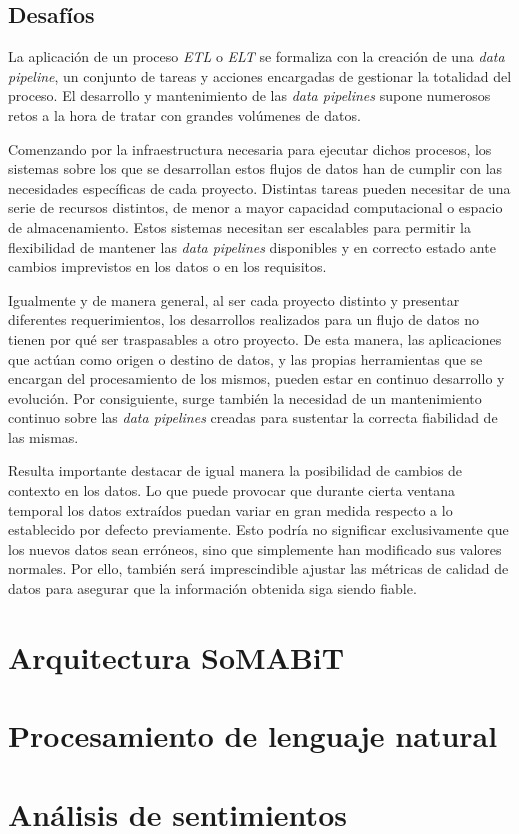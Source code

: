 \subsection{Desafíos}

La aplicación de un proceso \textit{ETL} o \textit{ELT} se formaliza con la creación de una \textit{data pipeline}, un conjunto de tareas y acciones encargadas de gestionar la totalidad del proceso. El desarrollo y mantenimiento de las \textit{data pipelines} supone numerosos retos a la hora de tratar con grandes volúmenes de datos.

Comenzando por la infraestructura necesaria para ejecutar dichos procesos, los sistemas sobre los que se desarrollan estos flujos de datos han de cumplir con las necesidades específicas de cada proyecto. Distintas tareas pueden necesitar de una serie de recursos distintos, de menor a mayor capacidad computacional o espacio de almacenamiento. Estos sistemas necesitan ser escalables para permitir la flexibilidad de mantener las \textit{data pipelines} disponibles y en correcto estado ante cambios imprevistos en los datos o en los requisitos.

Igualmente y de manera general, al ser cada proyecto distinto y presentar diferentes requerimientos, los desarrollos realizados para un flujo de datos no tienen por qué ser traspasables a otro proyecto. De esta manera, las aplicaciones que actúan como origen o destino de datos, y las propias herramientas que se encargan del procesamiento de los mismos, pueden estar en continuo desarrollo y evolución. Por consiguiente, surge también la necesidad de un mantenimiento continuo sobre las \textit{data pipelines} creadas para sustentar la correcta fiabilidad de las mismas.

Resulta importante destacar de igual manera la posibilidad de cambios de contexto en los datos. Lo que puede provocar que durante cierta ventana temporal los datos extraídos puedan variar en gran medida respecto a lo establecido por defecto previamente. Esto podría no significar exclusivamente que los nuevos datos sean erróneos, sino que simplemente han modificado sus valores normales. Por ello, también será imprescindible ajustar las métricas de calidad de datos para asegurar que la información obtenida siga siendo fiable.

\section{Arquitectura SoMABiT}

\section{Procesamiento de lenguaje natural}

\section{Análisis de sentimientos}